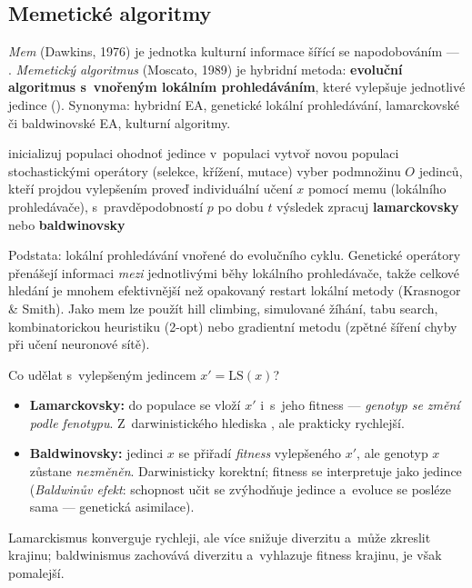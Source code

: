 \documentclass[11pt,a4paper]{article}
\theoremstyle{definition}
\begin{document}
\subsection{Memetické algoritmy}

\begin{defbox}
\emph{Mem} (Dawkins, 1976) je jednotka kulturní informace šířící se
napodobováním --- . \emph{Memetický algoritmus} (Moscato, 1989)
je hybridní metoda: \textbf{evoluční algoritmus s~vnořeným lokálním
prohledáváním}, které vylepšuje jednotlivé jedince ().
Synonyma: hybridní EA, genetické lokální prohledávání, lamarckovské či
baldwinovské EA, kulturní algoritmy.
\end{defbox}

\begin{algorithm}[!ht]
\caption{Memetický algoritmus}
\begin{algorithmic}[1]
\State inicializuj populaci
  \State ohodnoť jedince v~populaci
  \State vytvoř novou populaci stochastickými operátory (selekce, křížení, mutace)
  \State vyber podmnožinu $O$ jedinců, kteří projdou vylepšením
    \State proveď individuální učení $x$ pomocí memu (lokálního prohledávače),
      s~pravděpodobností $p$ po dobu $t$
    \State výsledek zpracuj \textbf{lamarckovsky} nebo \textbf{baldwinovsky}
  \EndFor
\EndWhile
\end{algorithmic}
\end{algorithm}

Podstata: lokální prohledávání vnořené do evolučního cyklu. Genetické operátory
přenášejí informaci \emph{mezi} jednotlivými běhy lokálního prohledávače, takže
celkové hledání je mnohem efektivnější než opakovaný restart lokální metody
(Krasnogor \& Smith). Jako mem lze použít hill climbing, simulované žíhání,
tabu search, kombinatorickou heuristiku (2-opt) nebo gradientní metodu
(zpětné šíření chyby při učení neuronové sítě).

\begin{defbox}
Co udělat s~vylepšeným jedincem $x' = \mathrm{LS}(x)$?
\begin{itemize}
\item \textbf{Lamarckovsky:} do populace se vloží $x'$ i~s~jeho fitness ---
  \emph{genotyp se změní podle fenotypu}. Z~darwinistického hlediska
  , ale prakticky rychlejší.
\item \textbf{Baldwinovsky:} jedinci $x$ se přiřadí \emph{fitness}
  vylepšeného $x'$, ale genotyp $x$ zůstane \emph{nezměněn}. Darwinisticky
  korektní; fitness se interpretuje jako  jedince
  (\emph{Baldwinův efekt}: schopnost učit se zvýhodňuje jedince a~evoluce
  se posléze  sama --- genetická asimilace).
\end{itemize}
Lamarckismus konverguje rychleji, ale více snižuje diverzitu a~může zkreslit
krajinu; baldwinismus zachovává diverzitu a~vyhlazuje fitness krajinu,
je však pomalejší.
\end{defbox}
\end{document}
